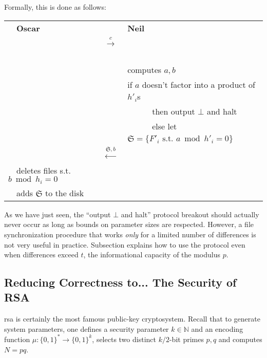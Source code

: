 \documentclass[11pt]{llncs}
\begin{document}
Formally, this is done as follows:\smallskip

\begin{center}
\begin{tabular}{|lcl|}\hline
~~{\bf Oscar}                       &                                                      &   {\bf Neil}~\\
                                   &~~{{\LARGE $\stackrel{c}{\longrightarrow}$}}~~        &   \\
                                   &                                                      &computes $a,b$~\\
                                   &                                                      &if $a$ doesn't factor into a product of $h'_i$s~\\
                                   &                                                      &~~~~~~then output $\bot$ and halt~\\
                                   &                                                      &~~~~~~else let $\mathfrak{S}=\{F'_i \mbox{~s.t.~} a \bmod h'_i =0\}$~~\\
                                   &~~{\LARGE $\stackrel{\mathfrak{S},b}{\longleftarrow}$}&\\
~~deletes files s.t. $b \bmod h_i =0$&                                                      &\\
~~adds $\mathfrak{S}$ to the disk    &                                                      &\\\hline
\end{tabular}
\end{center}

As we have just seen, the ``output $\bot$ and halt'' protocol breakout should actually never occur as long as bounds on parameter sizes are respected. However, a file synchronization procedure that works {\sl only} for a limited number of differences is not very useful in practice. Subsection \label{insuf} explains how to use the protocol even when differences exceed $t$, the informational capacity of the modulus $p$.

\subsection{Reducing Correctness to... The Security of RSA}
\label{rsa}

{\sc rsa} \cite{RSA} is certainly the most famous public-key cryptosystem. Recall that to generate \cite{RSA} system parameters, one defines a security parameter $k \in\mathbb{N}$ and an encoding function $\mu : \{0,1\}^* \rightarrow  \{0,1\}^k$, selects two distinct $k/2$-bit primes $p,q$ and computes $N=pq$.\smallskip
\end{document}
